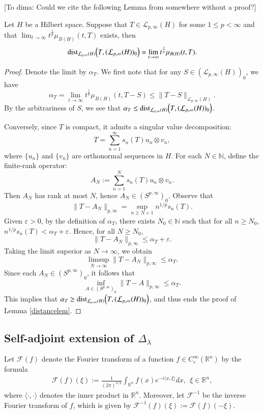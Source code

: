\documentclass[12pt]{amsart}
\begin{document}
{\color{blue}
{\color{red}[To dima: Could we cite the following Lemma from somewhere without a proof?]}
\begin{lemma}\label{distancelem}
Let $H$ be a Hilbert space. Suppose that $T\in \mathcal{L}_{p,\infty}(H)$ for some $1\leq p<\infty$ and that $\lim_{t\to\infty}t^{\frac1{p}}\mu_{B(H)}(t,T)$ exists, then
$${\rm dist}_{\mathcal{L}_{p,\infty}(H)}\Big(T,(\mathcal{L}_{p,\infty}(H))_0\Big)=\lim_{t\to\infty}t^{\frac1{p}}\mu_{B(H)}(t,T).$$
\end{lemma}
\begin{proof}
Denote the limit by $\alpha_T$. We first note that for any $S\in (\mathcal{L}_{p,\infty}(H))_0$, we have
$$\alpha_T=\lim_{t\to\infty}t^{\frac1{p}}\mu_{B(H)}(t,T-S)\leq \|T-S\|_{\mathcal{L}_{p,\infty}(H)}.$$
By the arbitrariness of $S$, we see that $\alpha_T\leq {\rm dist}_{\mathcal{L}_{p,\infty}(H)}\Big(T,(\mathcal{L}_{p,\infty}(H))_0\Big)$.

Conversely, since $T$ is compact, it admits a singular value decomposition:
\[
T = \sum_{n=1}^\infty s_n(T) u_n \otimes v_n,
\]
where $\{u_n\}$ and $\{v_n\}$ are orthonormal sequences in $H$. For each $N \in \mathbb{N}$, define the finite-rank operator:
\[
A_N := \sum_{n=1}^N s_n(T) u_n \otimes v_n.
\]
Then $A_N$ has rank at most $N$, hence $A_N \in (S^{p,\infty})_0$. Observe that
\[
\|T - A_N\|_{p,\infty} = \sup_{n \geq N+1} n^{1/p} s_n(T).
\]
Given $\varepsilon > 0$, by the definition of $\alpha_T$, there exists $N_0 \in \mathbb{N}$ such that for all $n \geq N_0$,
$
n^{1/p} s_n(T) < \alpha_T + \varepsilon.
$
Hence, for all $N \geq N_0$,
\[
\|T - A_N\|_{p,\infty} \leq \alpha_T + \varepsilon.
\]
Taking the limit superior as $N \to \infty$, we obtain
\[
\limsup_{N \to \infty} \|T - A_N\|_{p,\infty} \leq \alpha_T.
\]
Since each $A_N \in (S^{p,\infty})_0$, it follows that
\[
\inf_{A \in (S^{p,\infty})_0} \|T - A\|_{p,\infty} \leq \alpha_T.
\]
This implies that $\alpha_T\geq {\rm dist}_{\mathcal{L}_{p,\infty}(H)}\Big(T,(\mathcal{L}_{p,\infty}(H))_0\Big)$, and thus ends the proof of Lemma \ref{distancelem}.
\end{proof}

}
\subsection{Self-adjoint extension of $\Delta_\lambda$}\label{Selfexten}

Let $\mathcal{F}(f)$ denote the Fourier transform of a function $f\in C_c^\infty(\mathbb{R}^n)$ by the formula
\begin{align*}
\mathcal{F}(f)(\xi):=\frac{1}{(2\pi)^{n/2}}\int_{\mathbb{R}^{n}}f(x)e^{-i\langle x,\xi \rangle}dx, \ \ \xi\in\mathbb{R}^{n},
\end{align*}
where $\langle \cdot,\cdot \rangle$ denotes the inner product in $\mathbb{R}^n$.
Moreover, let $\mathcal{F}^{-1}$ be the inverse Fourier transform of $f$, which is given by $\mathcal{F}^{-1}(f)(\xi):=\mathcal{F}(f)(-\xi)$.
\end{document}
